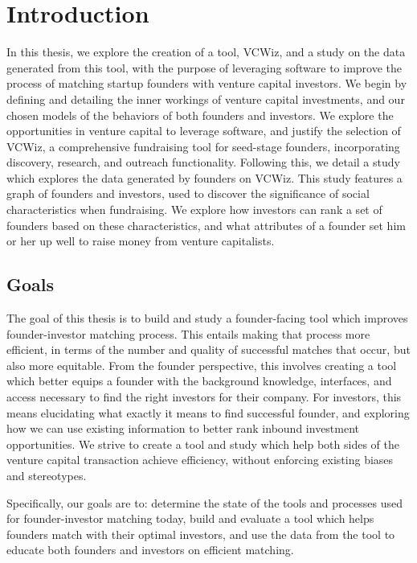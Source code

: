 \chapter{Introduction}

In this thesis, we explore the creation of a tool, VCWiz, and a study on the data generated from this tool, with the purpose of leveraging software to improve the process of matching startup founders with venture capital investors. We begin by defining and detailing the inner workings of venture capital investments, and our chosen models of the behaviors of both founders and investors. We explore the opportunities in venture capital to leverage software, and justify the selection of VCWiz, a comprehensive fundraising tool for seed-stage founders, incorporating discovery, research, and outreach functionality. Following this, we detail a study which explores the data generated by founders on VCWiz. This study features a graph of founders and investors, used to discover the significance of social characteristics when fundraising. We explore how investors can rank a set of founders based on these characteristics, and what attributes of a founder set him or her up well to raise money from venture capitalists.

\section{Goals}

The goal of this thesis is to build and study a founder-facing tool which improves founder-investor matching process. This entails making that process more efficient, in terms of the number and quality of successful matches that occur, but also more equitable. From the founder perspective, this involves creating a tool which better equips a founder with the background knowledge, interfaces, and access necessary to find the right investors for their company. For investors, this means elucidating what exactly it means to find successful founder, and exploring how we can use existing information to better rank inbound investment opportunities. We strive to create a tool and study which help both sides of the venture capital transaction achieve efficiency, without enforcing existing biases and stereotypes.

Specifically, our goals are to: determine the state of the tools and processes used for founder-investor matching today, build and evaluate a tool which helps founders match with their optimal investors, and use the data from the tool to educate both founders and investors on efficient matching.


